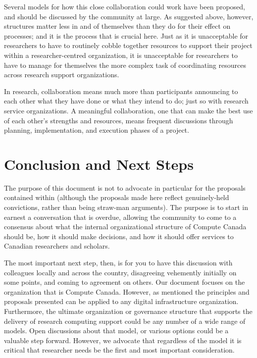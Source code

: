 \documentclass[11pt, letterpaper, twoside]{article}
\begin{document}

Several models for how this close collaboration could work have been
proposed, and should be discussed by the community at large. As
suggested above, however, structures matter less in and of themselves
than they do for their effect on processes; and it is the process that
is crucial here. Just as it is unacceptable for researchers to have to
routinely cobble together resources to support their project within a
researcher-centred organization, it is unacceptable for researchers to
have to manage for themselves the more complex task of coordinating
resources across research support organizations.

In research, collaboration means much more than participants announcing
to each other what they have done or what they intend to do; just so
with research service organizations. A meaningful collaboration, one
that can make the best use of each other's strengths and resources,
means frequent discussions through planning, implementation, and
execution phases of a project.

\section*{Conclusion and Next Steps}
%

The purpose of this document is not to advocate in particular for the
proposals contained within (although the proposals made here reflect
genuinely-held convictions, rather than being straw-man arguments). The
purpose is to start in earnest a conversation that is overdue, allowing
the community to come to a consensus about what the internal
organizational structure of Compute Canada should be, how it should make
decisions, and how it should offer services to Canadian researchers and
scholars.

The most important next step, then, is for you to have this discussion
with colleagues locally and across the country, disagreeing vehemently
initially on some points, and coming to agreement on others. 
Our document focuses on the organization that is Compute Canada.
However, as mentioned the principles and proposals presented can be
applied to any digital infrastructure organization. Furthermore, the
ultimate organization or governance structure that supports the delivery
of research computing support could be any number of a wide range of
models. Open discussions about that model, or various options could be a
valuable step forward. However, we advocate that regardless of the model
it is critical that researcher needs be the first and most important
consideration.
\end{document}
